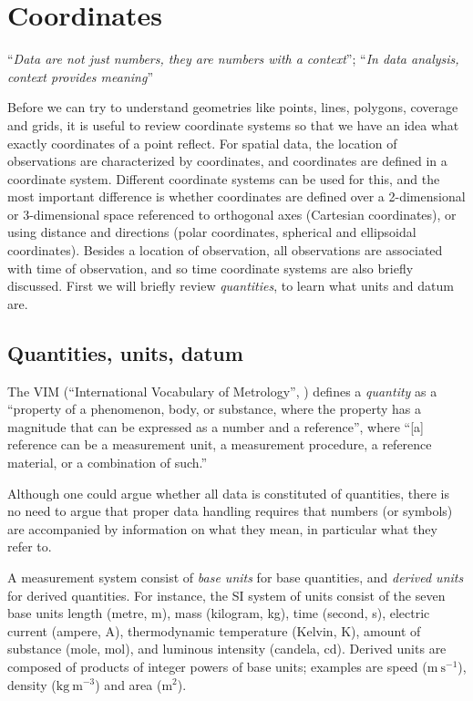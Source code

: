 \documentclass[]{book}
\begin{document}
\hypertarget{cs}{%
\chapter{Coordinates}\label{cs}}

``\emph{Data are not just numbers, they are numbers with a context}'';
``\emph{In data analysis, context provides meaning}'' \citep{cobbmoore}

Before we can try to understand geometries like points, lines,
polygons, coverage and grids, it is useful to review coordinate
systems so that we have an idea what exactly coordinates of a
point reflect. For spatial data, the location of observations
are characterized by coordinates, and coordinates are defined in
a coordinate system. Different coordinate systems can be used for
this, and the most important difference is whether coordinates are
defined over a 2-dimensional or 3-dimensional space referenced
to orthogonal axes (Cartesian coordinates), or using distance
and directions (polar coordinates, spherical and ellipsoidal
coordinates). Besides a location of observation, all observations
are associated with time of observation, and so time coordinate
systems are also briefly discussed. First we will briefly review
\emph{quantities}, to learn what units and datum are.

\hypertarget{units}{%
\section{Quantities, units, datum}\label{units}}

The VIM (``International Vocabulary of Metrology'', \citet{vim})
defines a \emph{quantity} as a ``property of a phenomenon, body, or
substance, where the property has a magnitude that can be expressed
as a number and a reference'', where ``{[}a{]} reference can be a measurement
unit, a measurement procedure, a reference material, or a combination
of such.''

Although one could argue whether all data is constituted of
quantities, there is no need to argue that proper data handling
requires that numbers (or symbols) are accompanied by information
on what they mean, in particular what they refer to.

A measurement system consist of \emph{base units} for base quantities, and
\emph{derived units} for derived quantities. For instance, the SI system
of units \citep{SI} consist of the seven base units length (metre,
m), mass (kilogram, kg), time (second, s), electric current
(ampere, A), thermodynamic temperature (Kelvin, K), amount of
substance (mole, mol), and luminous intensity (candela, cd).
Derived units are composed of products of integer powers of base
units; examples are speed (\(\mbox{m}~\mbox{s}^{-1}\)), density
(\(\mbox{kg}~\mbox{m}^{-3}\)) and area (\(\mbox{m}^2\)).
\end{document}

